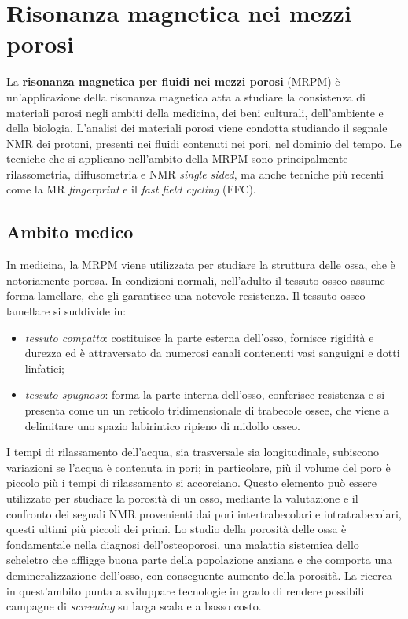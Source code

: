 \documentclass{report}
\numberwithin{equation}{section}
\numberwithin{figure}{section}
\begin{document}
\section{Risonanza magnetica nei mezzi porosi}
La \textbf{risonanza magnetica per fluidi nei mezzi porosi} (MRPM) è un'applicazione della risonanza magnetica atta a studiare la consistenza di materiali porosi negli ambiti della medicina, dei beni culturali, dell'ambiente e della biologia. L'analisi dei materiali porosi viene condotta studiando il segnale NMR dei protoni, presenti nei fluidi contenuti nei pori, nel dominio del tempo. Le tecniche che si applicano nell'ambito della MRPM sono principalmente rilassometria, diffusometria e NMR \textit{single sided}, ma anche tecniche più recenti come la MR \textit{fingerprint} e il \textit{fast field cycling} (FFC).

\subsection{Ambito medico}
In medicina, la MRPM viene utilizzata per studiare la struttura delle ossa, che è notoriamente porosa. In condizioni normali, nell'adulto il tessuto osseo assume forma lamellare, che gli garantisce una notevole resistenza. Il tessuto osseo lamellare si suddivide in:
\begin{itemize}[label=$-$]
    \item \emph{tessuto compatto}: costituisce la parte esterna dell'osso, fornisce rigidità e durezza ed è attraversato da numerosi canali contenenti vasi sanguigni e dotti linfatici;
    \item \emph{tessuto spugnoso}: forma la parte interna dell'osso, conferisce resistenza e si presenta come un un reticolo tridimensionale di trabecole ossee, che viene a delimitare uno spazio labirintico ripieno di midollo osseo.
\end{itemize}
I tempi di rilassamento dell'acqua, sia trasversale sia longitudinale, subiscono variazioni se l'acqua è contenuta in pori; in particolare, più il volume del poro è piccolo più i tempi di rilassamento si accorciano. Questo elemento può essere utilizzato per studiare la porosità di un osso, mediante la valutazione e il confronto dei segnali NMR provenienti dai pori intertrabecolari e intratrabecolari, questi ultimi più piccoli dei primi. Lo studio della porosità delle ossa è fondamentale nella diagnosi dell'osteoporosi, una malattia sistemica dello scheletro che affligge buona parte della popolazione anziana e che comporta una demineralizzazione dell'osso, con conseguente aumento della porosità. La ricerca in quest'ambito punta a sviluppare tecnologie in grado di rendere possibili campagne di \textit{screening} su larga scala e a basso costo.
\end{document}
